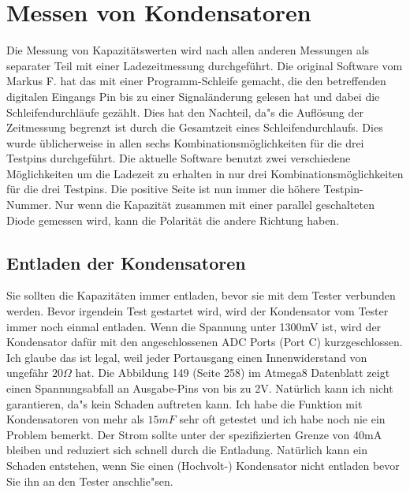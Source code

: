 \section{Messen von Kondensatoren}
Die Messung von Kapazit\"atswerten wird nach allen anderen Messungen als separater Teil mit einer Ladezeitmessung 
durchgef\"uhrt.
Die original Software vom Markus F. hat das mit einer Programm-Schleife gemacht, die den betreffenden digitalen
Eingangs Pin bis zu einer Signal\"anderung gelesen hat und dabei die Schleifendurchl\"aufe gez\"ahlt.
Dies hat den Nachteil, da"s die Aufl\"osung der Zeitmessung begrenzt ist durch die Gesamtzeit eines Schleifendurchlaufs.
Dies wurde \"ublicherweise in allen sechs Kombinationsm\"oglichkeiten f\"ur die drei Testpins durchgef\"uhrt.
Die aktuelle Software benutzt zwei verschiedene M\"oglichkeiten um die Ladezeit zu erhalten in nur drei
Kombinationsm\"oglichkeiten f\"ur die drei Testpins.
Die positive Seite ist nun immer die h\"ohere Testpin-Nummer.
Nur wenn die Kapazit\"at zusammen mit einer parallel geschalteten Diode gemessen wird,
kann die Polarit\"at die andere Richtung haben.

\subsection{Entladen der Kondensatoren}
Sie sollten die Kapazit\"aten immer entladen, bevor sie mit dem Tester verbunden werden.
Bevor irgendein Test gestartet wird, wird der Kondensator vom Tester immer noch einmal entladen.
Wenn die Spannung unter 1300mV ist, wird der Kondensator daf\"ur mit den angeschlossenen ADC Ports (Port C) kurzgeschlossen.
Ich glaube das ist legal, weil jeder Portausgang einen Innenwiderstand von ungef\"ahr \(20\Omega\) hat.
Die Abbildung 149 (Seite 258) im Atmega8 Datenblatt \cite{ATmega8} zeigt einen Spannungsabfall an Ausgabe-Pins von bis zu 2V.
Nat\"urlich kann ich nicht garantieren, da"s kein Schaden auftreten kann.
Ich habe die Funktion mit Kondensatoren von mehr als \(15 mF\) sehr oft getestet und ich habe noch nie ein Problem bemerkt.
Der Strom sollte unter der spezifizierten Grenze von 40mA bleiben und reduziert sich schnell durch die Entladung.
Nat\"urlich kann ein Schaden entstehen, wenn Sie einen (Hochvolt-) Kondensator nicht entladen bevor Sie ihn an den Tester anschlie"sen.

